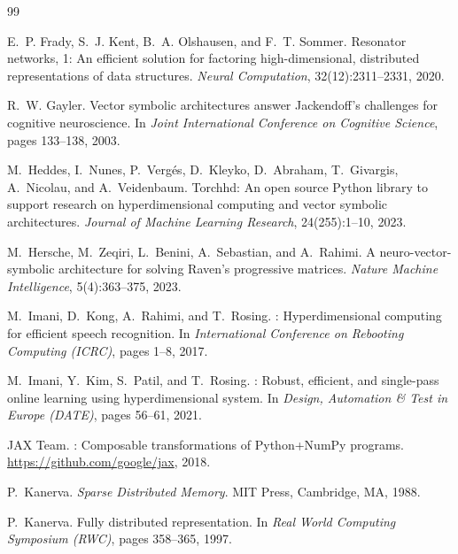 \documentclass[twoside,11pt]{article}
\begin{document}

\begin{thebibliography}{99}

E.~P. Frady, S.~J. Kent, B.~A. Olshausen, and F.~T. Sommer.
\newblock Resonator networks, 1: An efficient solution for factoring high-dimensional, distributed representations of data structures.
\newblock \textit{Neural Computation}, 32(12):2311--2331, 2020.

R.~W. Gayler.
\newblock Vector symbolic architectures answer {J}ackendoff's challenges for cognitive neuroscience.
\newblock In \textit{Joint International Conference on Cognitive Science}, pages 133--138, 2003.

M.~Heddes, I.~Nunes, P.~Verg\'es, D.~Kleyko, D.~Abraham, T.~Givargis, A.~Nicolau, and A.~Veidenbaum.
\newblock Torchhd: An open source {P}ython library to support research on hyperdimensional computing and vector symbolic architectures.
\newblock \textit{Journal of Machine Learning Research}, 24(255):1--10, 2023.

M.~Hersche, M.~Zeqiri, L.~Benini, A.~Sebastian, and A.~Rahimi.
\newblock A neuro-vector-symbolic architecture for solving {R}aven's progressive matrices.
\newblock \textit{Nature Machine Intelligence}, 5(4):363--375, 2023.

M.~Imani, D.~Kong, A.~Rahimi, and T.~Rosing.
: Hyperdimensional computing for efficient speech recognition.
\newblock In \textit{International Conference on Rebooting Computing (ICRC)}, pages 1--8, 2017.

M.~Imani, Y.~Kim, S.~Patil, and T.~Rosing.
: Robust, efficient, and single-pass online learning using hyperdimensional system.
\newblock In \textit{Design, Automation \& Test in Europe (DATE)}, pages 56--61, 2021.

JAX Team.
: Composable transformations of {P}ython+{N}um{P}y programs.
\newblock \url{https://github.com/google/jax}, 2018.

P.~Kanerva.
\newblock \textit{Sparse Distributed Memory}.
\newblock MIT Press, Cambridge, MA, 1988.

P.~Kanerva.
\newblock Fully distributed representation.
\newblock In \textit{Real World Computing Symposium (RWC)}, pages 358--365, 1997.


\end{thebibliography}
\end{document}
